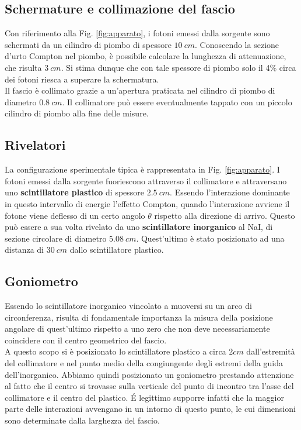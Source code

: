 \documentclass[8pt]{extarticle}
\begin{document}
\subsection{Schermature e collimazione del fascio}
Con riferimento alla Fig. \ref{fig:apparato}, i fotoni emessi dalla sorgente sono schermati da un cilindro di piombo di spessore $10 \ cm$. Conoscendo la sezione d'urto Compton nel piombo\cite{PDG_lead}, è possibile calcolare la lunghezza di attenuazione, che risulta $3 \ cm$. Si stima dunque che con tale spessore di piombo solo il 4\% circa dei fotoni riesca a superare la schermatura. \\
Il fascio è collimato grazie a un'apertura praticata nel cilindro di piombo di diametro $0.8 \ cm$. Il collimatore può essere eventualmente tappato con un piccolo cilindro di piombo alla fine delle misure.

\subsection{Rivelatori}
La configurazione sperimentale tipica è rappresentata in Fig. \ref{fig:apparato}. I fotoni emessi dalla sorgente fuoriescono attraverso il collimatore e attraversano uno \textbf{scintillatore plastico} di spessore $2.5 \ cm$. 
Essendo l'interazione dominante in questo intervallo di energie l'effetto Compton, quando
l'interazione avviene il fotone viene deflesso di un certo angolo $\theta$ rispetto alla direzione di arrivo.
Questo può essere a sua volta rivelato da uno \textbf{scintillatore inorganico} al NaI, di sezione circolare di diametro $5.08 \ cm$.
Quest'ultimo è stato posizionato ad una distanza di $30 \ cm$ dallo scintillatore plastico.

\subsection{Goniometro}

Essendo lo scintillatore inorganico vincolato a muoversi su un arco di circonferenza, risulta di fondamentale importanza la misura della posizione angolare di quest'ultimo rispetto a uno zero che non deve necessariamente coincidere con il centro geometrico del fascio. \\
A questo scopo si è posizionato lo scintillatore plastico a circa $2 cm$ dall'estremità del collimatore e nel punto medio della congiungente degli estremi della guida dell'inorganico.
Abbiamo quindi posizionato un goniometro prestando attenzione al fatto che il centro si trovasse sulla verticale del punto di incontro tra l'asse del collimatore e il centro del plastico.
\'E legittimo supporre infatti che la maggior parte delle interazioni avvengano in un intorno di questo punto, le cui dimensioni sono determinate dalla larghezza del fascio. \\
\end{document}
